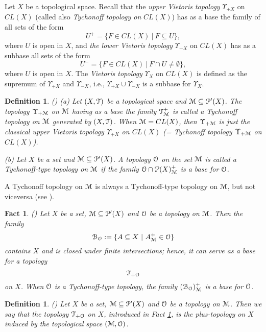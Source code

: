 \documentclass[12pt,draft,leqno]{article}
\newtheorem{defi}[theorem]{Definition}
\newtheorem{fact}[theorem]{Fact}
\def\UP{\Upsilon}
\def\ap{^\prime}
\def\st{\ |\ }
\def\BB{{\cal B}}
\def\MM{{\cal M}}
\def\OO{{\cal O}}
\def\PP{{\cal P}}
\def\TT{{\cal T}}
\begin{document}
Let $X$ be a topological space. Recall that the {\em  upper Vietoris topology} $\UP_{+X}$ on $CL(X)$ (called also {\em Tychonoff topology on} $CL(X)$) has as a base the family of all sets of the form $$U^+=\{F\in CL(X)\st F\subseteq U\},$$ where $U$ is open in $X$, and {\em the lower Vietoris topology} $\UP_{-X}$ on $CL(X)$ has as a subbase all sets of the form $$U^-=\{F\in CL(X)\st F\cap U\not=\emptyset\},$$ where $U$ is open in $X$. The {\em Vietoris topology} $\UP_X$ on $CL(X)$ is defined as the supremum of  $\UP_{+X}$ and $\UP_{-X}$, i.e., $\UP_{+X}\cup \UP_{-X}$ is a subbase for $\UP_X$.

\begin{defi}\label{Tichnoff type}{\rm (\cite{DV})}
\rm
(a) Let $(X,\TT)$ be a topological space and $\MM\subseteq\PP\ap(X)$. The topology $\UP_{+\MM}$ on $\MM$ having as a base the family $\TT_{\MM}^+$ is called a {\em Tychonoff topology on} $\MM$ generated by $(X,\TT)$. When $\MM=CL(X)$, then $\UP_{+\MM}$ is just the classical upper Vietoris topology $\UP_{+X}$ on $CL(X)$ (= Tychonoff topology $\UP_{+\MM}$ on $CL(X)$).

\medskip

(b) Let $X$ be a set and $\MM\subseteq\PP\ap(X)$. A topology $\OO$ on the set $\MM$ is called a {\em Tychonoff-type topology on} $\MM$ if the family $\OO\cap\PP(X)_{\MM}^+$ is a base for $\OO$.
\end{defi}

A Tychonoff topology on $\MM$ is always a Tychonoff-type topology on $\MM$, but not viceversa (see \cite{DOT}).

\begin{fact}\label{u-Vietoris-type}{\rm (\cite{DV})}
\rm
Let $X$ be a set, $\MM\subseteq\PP\ap(X)$ and $\OO$ be a topology on $\MM$. Then the family $$\BB_{\OO}:=\{A\subseteq X\st A_{\MM}^+\in\OO\}$$ contains $X$ and is closed under
finite intersections; hence, it can serve as a base for a topology $$\TT_{+\OO}$$ on $X$. When $\OO$ is a Tychonoff-type topology, the family $(\BB_{\OO})_{\MM}^+$ is a base for $\OO$.
\end{fact}

\begin{defi}\label{2.5new}{\rm (\cite{DV})}
\rm
Let $X$ be a set, $\MM\subseteq\PP\ap(X)$ and $\OO$ be a topology on $\MM$. Then we  say that the topology $\TT_{+\OO}$ on $X$, introduced in Fact \ref{u-Vietoris-type}, is {\em the plus-topology on $X$  induced by the topological space} $(\MM,\OO)$.
\end{defi}
\end{document}
